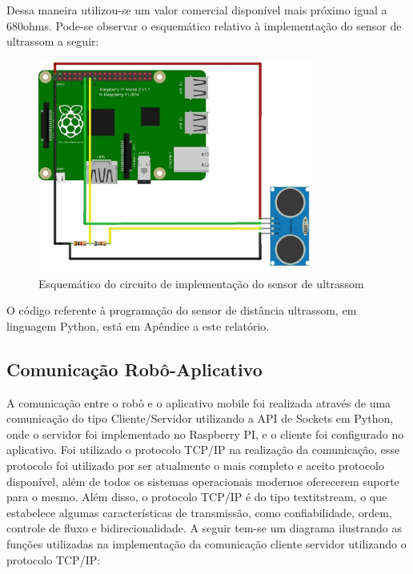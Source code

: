 Dessa maneira utilizou-se um valor comercial disponível mais próximo igual a 680ohms. Pode-se observar o esquemático relativo à
implementação do sensor de ultrassom a seguir:

\begin{figure}[H]
    \centering
    \includegraphics[width=0.8\textwidth]{figuras/esquematico_ultrassom.eps}
    \caption{Esquemático do circuito de implementação do sensor de ultrassom}
    \label{fig:esquematico_ultrassom}
\end{figure}

O código referente à programação do sensor de distância ultrassom, em linguagem Python, está em Apêndice a este relatório.

\subsection{Comunicação Robô-Aplicativo}

A comunicação entre o robô e o aplicativo mobile foi realizada através de uma comunicação do tipo Cliente/Servidor utilizando a
API de Sockets em Python, onde o servidor foi implementado no Raspberry PI, e o cliente foi configurado no aplicativo. Foi utilizado
o protocolo TCP/IP na realização da comunicação, esse protocolo foi utilizado por ser atualmente o mais completo e aceito protocolo
disponível, além de todos os sistemas operacionais modernos oferecerem suporte para o mesmo. Além disso, o protocolo TCP/IP é do tipo 
textit{stream}, o que estabelece algumas características de transmissão, como confiabilidade, ordem, controle de fluxo e bidirecionalidade.
A seguir tem-se um diagrama ilustrando as funções utilizadas na implementação da comunicação cliente servidor utilizando o protocolo TCP/IP:

